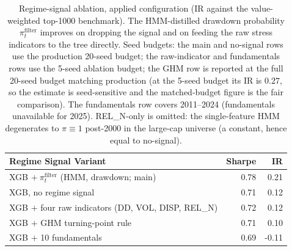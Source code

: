 \begin{table}[H]
\centering
\smallskip
\begin{tabular}{l r r}
\toprule
Regime Signal Variant & Sharpe & IR \\
\midrule
XGB $+\ \pi_t^{\text{filter}}$ (HMM, drawdown; main) & 0.78 & 0.21 \\
XGB, no regime signal                                & 0.71 & 0.12 \\
XGB $+$ four raw indicators (DD, VOL, DISP, REL\_N)  & 0.72 & 0.12 \\
XGB $+$ GHM turning-point rule                       & 0.71 & 0.10 \\
XGB $+$ 10 fundamentals                              & 0.69 & -0.11 \\
\bottomrule
\end{tabular}
\caption{Regime-signal ablation, applied configuration (IR against the value-weighted top-1000 benchmark). The HMM-distilled drawdown probability $\pi_t^{\text{filter}}$ improves on dropping the signal and on feeding the raw stress indicators to the tree directly. Seed budgets: the main and no-signal rows use the production 20-seed budget; the raw-indicator and fundamentals rows use the 5-seed ablation budget; the GHM row is reported at the full 20-seed budget matching production (at the 5-seed budget its IR is $0.27$, so the estimate is seed-sensitive and the matched-budget figure is the fair comparison). The fundamentals row covers 2011--2024 (fundamentals unavailable for 2025). REL\_N-only is omitted: the single-feature HMM degenerates to $\pi \equiv 1$ post-2000 in the large-cap universe (a constant, hence equal to no-signal).}
\label{tab:regime_signal_ablation}
\end{table}
